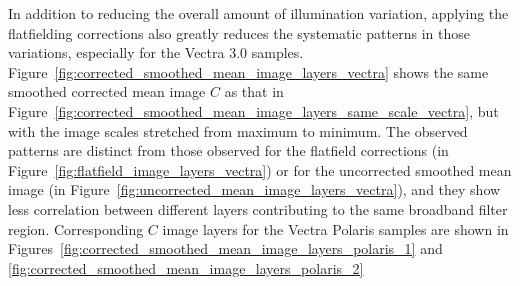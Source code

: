 \documentclass[letterpaper,11pt]{article}
\newcommand{\reffig}[1]{Figure~\ref{#1}}
\begin{document}
In addition to reducing the overall amount of illumination variation, applying the flatfielding corrections also greatly reduces the systematic patterns in those variations, especially for the Vectra 3.0 samples. \reffig{fig:corrected_smoothed_mean_image_layers_vectra} shows the same smoothed corrected mean image $C$ as that in \reffig{fig:corrected_smoothed_mean_image_layers_same_scale_vectra}, but with the image scales stretched from maximum to minimum. The observed patterns are distinct from those observed for the flatfield corrections (in \reffig{fig:flatfield_image_layers_vectra}) or for the uncorrected smoothed mean image (in \reffig{fig:uncorrected_mean_image_layers_vectra}), and they show less correlation between different layers contributing to the same broadband filter region. Corresponding $C$ image layers for the Vectra Polaris samples are shown in Figures~\ref{fig:corrected_smoothed_mean_image_layers_polaris_1} and \ref{fig:corrected_smoothed_mean_image_layers_polaris_2}
\end{document}
